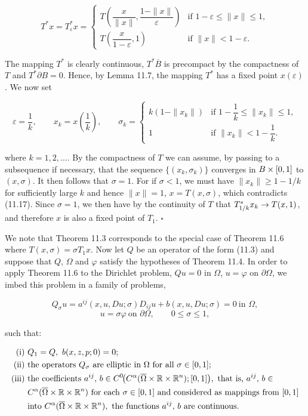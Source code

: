 \[
T^{*}x=T_{\varepsilon}^{*}x=
\begin{cases}
T\!\left(\dfrac{x}{\|x\|},\dfrac{1-\|x\|}{\varepsilon}\right)
& \text{if }1-\varepsilon\leq \|x\|\leq 1,\\[1.1em]
T\!\left(\dfrac{x}{1-\varepsilon},1\right)
& \text{if }\|x\|<1-\varepsilon.
\end{cases}
\]

The mapping $T^{*}$ is clearly continuous, $T^{*}\overline{B}$ is precompact by the compactness of $T$
and $T^{*}\partial B=0$. Hence, by Lemma 11.7, the mapping $T^{*}$ has a fixed point $x(\varepsilon)$.
We now set

\[
\varepsilon=\frac{1}{k},\qquad x_{k}=x\!\left(\frac{1}{k}\right),\qquad \sigma_{k}=
\begin{cases}
k(1-\|x_{k}\|) & \text{if }1-\dfrac{1}{k}\leq \|x_{k}\|\leq 1,\\[0.8em]
1 & \text{if }\|x_{k}\|<1-\dfrac{1}{k}.
\end{cases}
\]





\noindent where $k=1,2,\dots$. By the compactness of $T$ we can assume, by passing to a
subsequence if necessary, that the sequence $\{(x_k,\sigma_k)\}$ converges in $B\times[0,1]$ to
$(x,\sigma)$. It then follows that $\sigma=1$. For if $\sigma<1$, we must have $\|x_k\|\geq 1-1/k$ for
sufficiently large $k$ and hence $\|x\|=1$, $x=T(x,\sigma)$, which contradicts (11.17).
Since $\sigma=1$, we then have by the continuity of $T$ that $T^*_{1/k}x_k\to T(x,1)$, and therefore
$x$ is also a fixed point of $T_1$. $\square$

\medskip

\noindent We note that Theorem 11.3 corresponds to the special case of Theorem 11.6
where $T(x,\sigma)=\sigma T_1x$. Now let $Q$ be an operator of the form (11.3) and suppose
that $Q$, $\Omega$ and $\varphi$ satisfy the hypotheses of Theorem 11.4. In order to apply Theorem
11.6 to the Dirichlet problem, $Qu=0$ in $\Omega$, $u=\varphi$ on $\partial\Omega$, we imbed this problem
in a family of problems,

\[
Q_{\sigma}u=a^{ij}(x,u,Du;\sigma)D_{ij}u+b(x,u,Du;\sigma)=0\ \text{in }\Omega,
\]
\[
u=\sigma\varphi\ \text{on }\partial\Omega,\qquad 0\leq \sigma\leq 1,
\]

\noindent such that:

\begin{align*}
\text{(i)}\ & Q_1=Q,\ b(x,z,p;0)=0;\\
\text{(ii)}\ & \text{the operators }Q_{\sigma}\text{ are elliptic in }\Omega\text{ for all }\sigma\in[0,1];\\
\text{(iii)}\ & \text{the coefficients }a^{ij},\, b\in C^0\!\bigl(C^{\alpha}(\overline{\Omega}\times \R\times \R^n);[0,1]\bigr),\ \text{that is, }a^{ij},\, b\in\\
& C^{\alpha}(\overline{\Omega}\times \R\times \R^n)\text{ for each }\sigma\in[0,1]\text{ and considered as mappings from }[0,1]\\
& \text{into }C^{\alpha}(\overline{\Omega}\times \R\times \R^n),\ \text{the functions }a^{ij},\, b\text{ are continuous.}
\end{align*}

